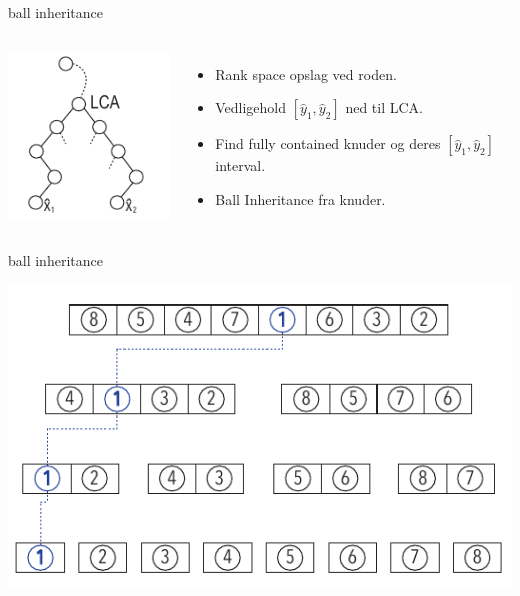 \documentclass[pdf]{beamer}
\begin{document}
\begin{frame}{ball inheritance}
  \begin{center}
    \begin{columns}
        \includegraphics[scale=1.5]{pictures/BIS.pdf}
        \begin{itemize}
          \item Rank space opslag ved roden.
          \item Vedligehold $[\hat{y}_1, \hat{y}_2]$ ned til LCA.
          \item Find fully contained knuder og deres $[\hat{y}_1, \hat{y}_2]$ interval.
          \item Ball Inheritance fra knuder.
        \end{itemize}
      \end{columns}
  \end{center}
\end{frame}


\begin{frame}{ball inheritance}
  \begin{center}
    \includegraphics[scale=1.0]{pictures/bolde_1.pdf}
  \end{center}
\end{frame}
\end{document}
